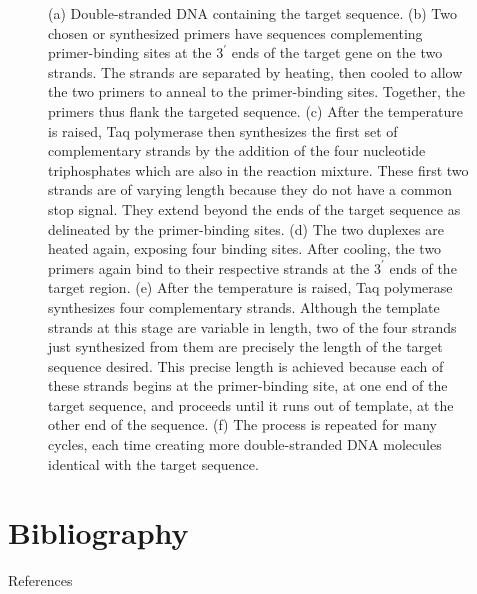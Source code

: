 \documentclass[11pt,dvipsnames,ignorenonframetext,aspectratio=169]{beamer}
\begin{document}
\begin{frame}{}
\begin{figure}
\begin{columns}[T,onlytextwidth]
\caption{\newline (a) Double-stranded DNA containing the target sequence. \newline (b) Two chosen or synthesized primers have sequences complementing primer-binding sites at the $3^\prime$ ends of the target gene on the two strands. The strands are separated by heating, then cooled to allow the two primers to anneal to the primer-binding sites. Together, the primers thus flank the targeted sequence. \newline (c) After the temperature is raised, Taq polymerase then synthesizes the first set of complementary strands by the addition of the four nucleotide triphosphates which are also in the reaction mixture. These first two strands are of varying length because they do not have a common stop signal. They extend beyond the ends of the target sequence as delineated by the primer-binding sites. \newline (d) The two duplexes are heated again, exposing four binding sites. After cooling, the two primers again bind to their respective strands at the $3^\prime$ ends of the target region. \newline (e) After the temperature is raised, Taq polymerase synthesizes four complementary strands. Although the template strands at this stage are variable in length, two of the four strands just synthesized from them are precisely the length of the target sequence desired. This precise length is achieved because each of these strands begins at the primer-binding site, at one end of the target sequence, and proceeds until it runs out of template, at the other end of the sequence. \newline (f) The process is repeated for many cycles, each time creating more double-stranded DNA molecules identical with the target sequence.}
\label{fig:pcr}
\end{columns}
\end{figure}

\end{frame}

\hypertarget{bibliography}{%
\section{Bibliography}\label{bibliography}}

\begin{frame}{References}
\protect\hypertarget{references}{}

\end{frame}
\end{document}
